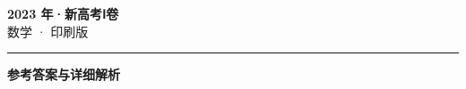 \documentclass[zihao=5, a4paper]{ctexart}
\begin{document}
\begin{center}
  {\Large\bfseries 2023 年·新高考Ⅰ卷}\\[4pt]
  {\large 数学 · 印刷版}
\end{center}
\medskip
{}

\par\bigskip\hrule\bigskip
{}
\begin{center}{\large\bfseries 参考答案与详细解析}\end{center}
\smallskip

\end{document}
